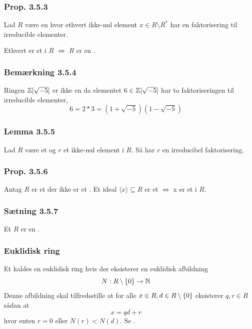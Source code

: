 \subsubsection{Prop. 3.5.3}
\label{Prop. 3.5.3}
Lad $R$ være en  hvor ethvert ikke-nul element $x \in R\setminus
R^*$ har en faktorisering til irreducible elementer. 

Ethvert  er et  i $R$ $\iff$
$R$ er en .

\subsubsection{Bemærkning 3.5.4}
\label{Bemaerkning 3.5.4}
Ringen $\mathbb{Z}[\sqrt{-5}]$ er ikke en  da elementet $6 \in
\mathbb{Z}[\sqrt{-5}]$ har to faktoriseringen til irreducible elementer,
\begin{equation*}
  6 = 2 * 3 = (1 + \sqrt{-5})(1 - \sqrt{-5})
\end{equation*}

\subsubsection{Lemma 3.5.5}
\label{Lemma 3.5.5}
Lad $R$ være et  og $r$ et ikke-nul element i $R$. Så
har $r$ en irreducibel faktorisering.

\subsubsection{Prop. 3.5.6}
\label{Prop. 3.5.6}
Antag $R$ er et  der ikke er et . Et
ideal $\langle x \rangle \subseteq R$ er et  $\iff$ x
er et  i $R$.

\subsubsection{Sætning 3.5.7}
\label{Saetning 3.5.7}
Et  $R$ er en .

\subsubsection{Euklidisk ring}
\label{Euklidisk ring}
Et  kaldes en euklidisk ring hvis der eksisterer en
euklidisk afbildning
\begin{equation*}
  N: R\setminus\{ 0 \} \rightarrow \mathbb{N}
\end{equation*}
Denne afbildning skal tilfredsstille at for alle $x \in R, d \in
R\setminus\{ 0 \}$ eksisterer $q,r \in R$ sådan at
\begin{equation*}
  x = qd + r
\end{equation*}
hvor enten $r = 0$ eller $N(r) < N(d)$. Se .

